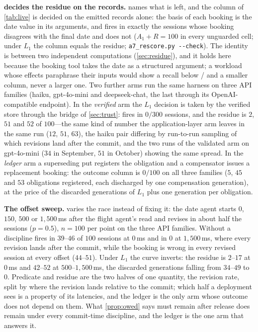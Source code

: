 \smallskip\noindent\textbf{\Rp{} decides the residue on the records.}
 names what is left, and the \Rp{} column of
\cref{tab:live} is decided on the emitted records alone: the basis of each
booking is the date value in its arguments, and \Rp{} fires in exactly the
sessions whose booking disagrees with the final date and  does not
($A_1+R=100$ in every unguarded cell; under $L_1$ the \Rp{} column equals
the residue; \texttt{a7\_rescore.py -{}-check}). The identity is between two
independent computations (\cref{sec:residue}), and it holds here because
the booking tool takes the date as a structured argument; a workload whose
effects paraphrase their inputs would show a recall below
\HypBasisRecovered/\HypBookings{} and a smaller \Rp{} column, never a larger
one. Two further arms run the same harness on three API families (haiku,
gpt-4o-mini and deepseek-chat, the last through its OpenAI-compatible
endpoint). In the \emph{verified} arm the $L_1$ decision is taken by the
verified store through the bridge of \cref{sec:trust}:  fires in $0/300$
sessions, and the residue is $2$, $51$ and $52$ of $100$---the same kind of
number the application-layer arm leaves in the same run ($12$, $51$, $63$),
the haiku pair differing by run-to-run sampling of which revisions land
after the commit, and the two runs of the validated arm on gpt-4o-mini ($34$
in September, $51$ in October) showing the same spread. In the \emph{ledger}
arm a superseding put registers the obligation and a compensator issues a
replacement booking: the outcome column is $0/100$ on all three families
($5$, $45$ and $53$ obligations registered, each discharged by one
compensation generation), at the price of the discarded generations of $L_1$
plus one generation per obligation.

\smallskip\noindent\textbf{The offset sweep.}  varies the
race instead of fixing it: the date agent starts $0$, $150$, $500$ or
$1{,}500$\,ms after the flight agent's read and revises in about half the
sessions ($p=0.5$), $n=100$ per point on the three API families. Without a
discipline  fires in $39$--$46$ of $100$ sessions at $0$\,ms and in $0$ at
$1{,}500$\,ms, where every revision lands after the commit, while the
booking is wrong in every revised session at every offset ($44$--$51$).
Under $L_1$ the curve inverts: the residue is $2$--$17$ at $0$\,ms and
$42$--$52$ at $500$--$1{,}500$\,ms, the discarded generations falling from
$34$--$49$ to $0$. Predicate and residue are the two halves of one quantity,
the revision rate, split by where the revision lands relative to the commit;
which half a deployment sees is a property of its latencies, and the ledger
is the only arm whose outcome does not depend on them. What
\cref{prop:owed} says must remain after release does remain under every
commit-time discipline, and the ledger is the one arm that answers it.

